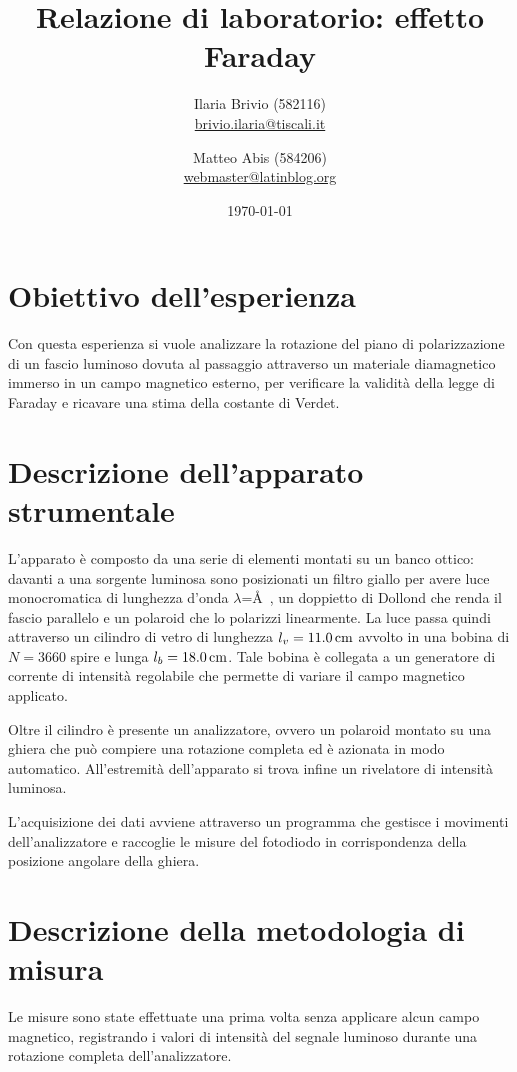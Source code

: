 \documentclass[italian,a4paper]{article}
\begin{document}
\title{Relazione di laboratorio: effetto Faraday}
\author{\normalsize Ilaria Brivio (582116)\\%
\normalsize \url{brivio.ilaria@tiscali.it}%
\and %
\normalsize Matteo Abis (584206)\\ %
\normalsize \url{webmaster@latinblog.org}}
\date{\today}
\maketitle
\section{Obiettivo dell'esperienza}
Con questa esperienza si vuole analizzare la rotazione del piano di polarizzazione di un fascio luminoso dovuta al passaggio attraverso un materiale diamagnetico immerso in un campo magnetico esterno, per verificare la validità della legge di Faraday e ricavare una stima della costante di Verdet.
\section{Descrizione dell'apparato strumentale}
L'apparato è composto da una serie di elementi montati su un banco ottico: davanti a una sorgente luminosa sono posizionati un filtro giallo per avere luce monocromatica di lunghezza d'onda $\lambda$=\unit[5893]{\AA{}}, un doppietto di Dollond che renda il fascio parallelo e un polaroid che lo polarizzi linearmente.
La luce passa quindi attraverso un cilindro di vetro di lunghezza $l_v=\unit[11.0]{cm}$ avvolto in una bobina di $N= 3660$ spire e lunga $l_b=\unit[18.0]{cm}$. Tale bobina è collegata a un generatore di corrente di intensità regolabile che permette di variare il campo magnetico applicato.

Oltre il cilindro è presente un analizzatore, ovvero un polaroid montato su una ghiera che può compiere una rotazione completa ed è azionata in modo automatico.
All'estremità dell'apparato si trova infine un rivelatore di intensità luminosa. 

L'acquisizione dei dati avviene attraverso un programma che gestisce i movimenti dell'analizzatore e raccoglie le misure del fotodiodo in corrispondenza della posizione angolare della ghiera.
\section{Descrizione della metodologia di misura}
Le misure sono state effettuate una prima volta senza applicare alcun campo magnetico, registrando i valori di intensità del segnale luminoso durante una rotazione completa dell'analizzatore.
\end{document}
